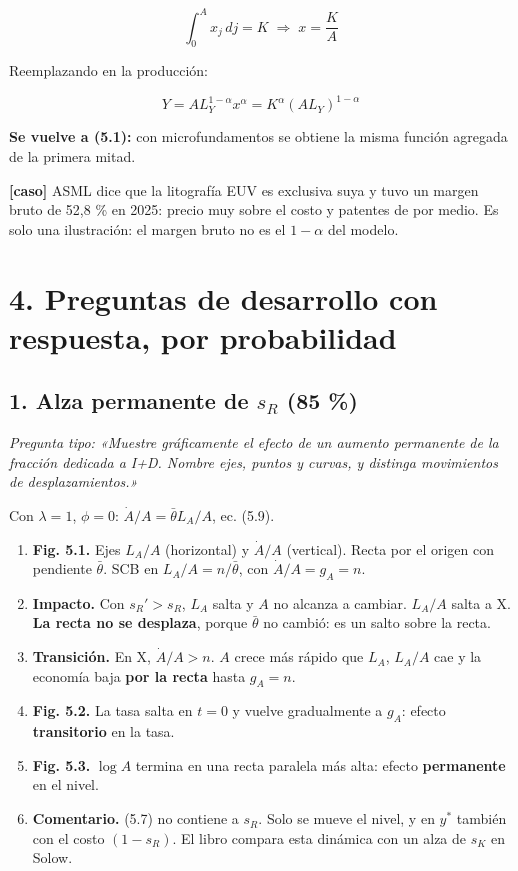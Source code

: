 \documentclass[11pt,a4paper]{article}
\begin{document}
\begin{equation*}\int_0^A x_j\, dj = K \;\Rightarrow\; x = \frac{K}{A} \tag{5.15}\end{equation*}

Reemplazando en la producción:

\begin{equation*}Y = AL_Y^{1-\alpha}x^\alpha = K^\alpha(AL_Y)^{1-\alpha} \tag{5.16}\end{equation*}

\textbf{Se vuelve a (5.1):} con microfundamentos se obtiene la misma función agregada de la primera mitad.

\textbf{[caso]} ASML dice que la litografía EUV es exclusiva suya y tuvo un margen bruto de 52,8 \% en 2025: precio muy sobre el costo y patentes de por medio. Es solo una ilustración: el margen bruto no es el $1-\alpha$ del modelo.

\section*{4. Preguntas de desarrollo con respuesta, por probabilidad}

\subsection*{1. Alza permanente de $s_R$ (85 \%)}

\emph{Pregunta tipo: «Muestre gráficamente el efecto de un aumento permanente de la fracción dedicada a I+D. Nombre ejes, puntos y curvas, y distinga movimientos de desplazamientos.»}

Con $\lambda = 1$, $\phi = 0$: $\dot A/A = \bar\theta L_A/A$, ec. (5.9).

\begin{enumerate}[leftmargin=*,itemsep=2pt,topsep=2pt]
\item \textbf{Fig. 5.1.} Ejes $L_A/A$ (horizontal) y $\dot A/A$ (vertical). Recta por el origen con pendiente $\bar\theta$. SCB en $L_A/A = n/\bar\theta$, con $\dot A/A = g_A = n$.
\item \textbf{Impacto.} Con $s_R' > s_R$, $L_A$ salta y $A$ no alcanza a cambiar. $L_A/A$ salta a X. \textbf{La recta no se desplaza}, porque $\bar\theta$ no cambió: es un salto sobre la recta.
\item \textbf{Transición.} En X, $\dot A/A > n$. $A$ crece más rápido que $L_A$, $L_A/A$ cae y la economía baja \textbf{por la recta} hasta $g_A = n$.
\item \textbf{Fig. 5.2.} La tasa salta en $t = 0$ y vuelve gradualmente a $g_A$: efecto \textbf{transitorio} en la tasa.
\item \textbf{Fig. 5.3.} $\log A$ termina en una recta paralela más alta: efecto \textbf{permanente} en el nivel.
\item \textbf{Comentario.} (5.7) no contiene a $s_R$. Solo se mueve el nivel, y en $y^*$ también con el costo $(1-s_R)$. El libro compara esta dinámica con un alza de $s_K$ en Solow.
\end{enumerate}
\end{document}
